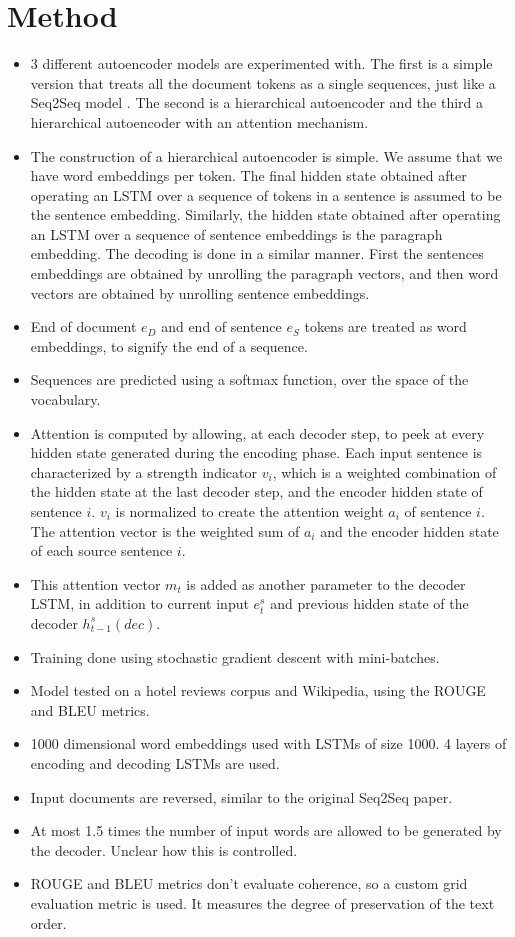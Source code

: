 \documentclass[12pt]{scrartcl}
\begin{document}
\section{Method}
  \begin{itemize}
    \item 3 different autoencoder models are experimented with. The first is a simple version that treats all the document tokens as a single sequences, just like a Seq2Seq model \cite{sutskever2014sequence}. The second is a hierarchical autoencoder and the third a hierarchical autoencoder with an attention mechanism.
    \item The construction of a hierarchical autoencoder is simple. We assume that we have word embeddings per token. The final hidden state obtained after operating an LSTM over a sequence of tokens in a sentence is assumed to be the sentence embedding. Similarly, the hidden state obtained after operating an LSTM over a sequence of sentence embeddings is the paragraph embedding. The decoding is done in a similar manner. First the sentences embeddings are obtained by unrolling the paragraph vectors, and then word vectors are obtained by unrolling sentence embeddings.
    \item End of document $e_D$ and end of sentence $e_S$ tokens are treated as word embeddings, to signify the end of a sequence.
    \item Sequences are predicted using a softmax function, over the space of the vocabulary.
    \item Attention is computed by allowing, at each decoder step, to peek at every hidden state generated during the encoding phase. Each input sentence is characterized by a strength indicator $v_i$, which is a weighted combination of the hidden state at the last decoder step, and the encoder hidden state of sentence $i$. $v_i$ is normalized to create the attention weight $a_i$ of sentence $i$. The attention vector is the weighted sum of $a_i$ and the encoder hidden state of each source sentence $i$.
    \item This attention vector $m_t$ is added as another parameter to the decoder LSTM, in addition to current input $e^s_t$ and previous hidden state of the decoder $h^s_{t-1} (dec)$.
    \item Training done using stochastic gradient descent with mini-batches.
    \item Model tested on a hotel reviews corpus and Wikipedia, using the ROUGE and BLEU metrics.
    \item 1000 dimensional word embeddings used with LSTMs of size 1000. 4 layers of encoding and decoding LSTMs are used. 
    \item Input documents are reversed, similar to the original Seq2Seq paper. \cite{sutskever2014sequence}
    \item At most 1.5 times the number of input words are allowed to be generated by the decoder. Unclear how this is controlled.
    \item ROUGE and BLEU metrics don't evaluate coherence, so a custom grid evaluation metric is used. It measures the degree of preservation of the text order.
  \end{itemize}
\end{document}
